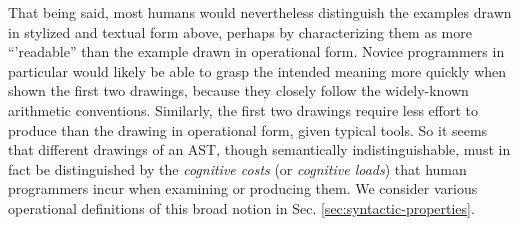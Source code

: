 That being said, most humans would nevertheless distinguish the examples drawn in stylized and textual form above, perhaps by characterizing them as more ``'readable'' than the example drawn in operational form. Novice programmers in particular would likely be able to grasp the intended meaning more quickly when shown the first two drawings, because they closely follow the widely-known arithmetic conventions. Similarly, the first two drawings  require less effort to produce than the drawing in operational form, given typical tools. %
So it seems that different drawings of an AST, though semantically indistinguishable, must in fact be distinguished by the \emph{cognitive costs} (or \emph{cognitive loads}) that human programmers incur when examining or producing them. We consider various operational definitions of this broad notion in Sec. \ref{sec:syntactic-properties}. %

